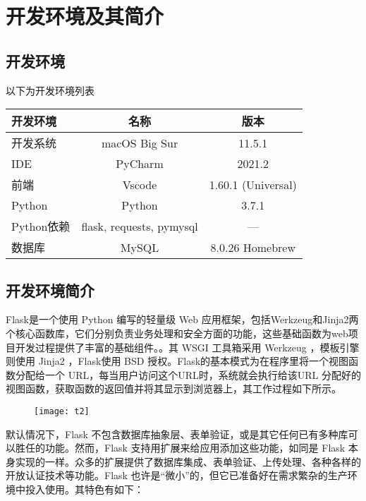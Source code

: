 \chapter{开发环境及其简介}
\section{开发环境}

以下为开发环境列表
\begin{center}
  \begin{tabular}{lcc}
    \hline
    开发环境 & 名称 & 版本 \\
    \hline
    开发系统 & macOS Big Sur & 11.5.1\\
    IDE & PyCharm & 2021.2\\
    前端 & Vscode & 1.60.1 (Universal)\\
    Python & Python & 3.7.1\\
    Python依赖 & flask, requests, pymysql &  --- \\
    数据库 & MySQL & 8.0.26 Homebrew\\
    \hline
  \end{tabular}
\end{center}

\section{开发环境简介}

Flask是一个使用 Python 编写的轻量级 Web 应用框架，包括Werkzeug和Jinja2两个核心函数库，它们分别负责业务处理和安全方面的功能，这些基础函数为web项目开发过程提供了丰富的基础组件。。其 WSGI 工具箱采用 Werkzeug ，模板引擎则使用 Jinja2 ，Flask使用 BSD 授权。Flask的基本模式为在程序里将一个视图函数分配给一个 URL，每当用户访问这个URL时，系统就会执行给该URL 分配好的视图函数，获取函数的返回值并将其显示到浏览器上，其工作过程如下所示。\citep{grinberg2018flask}

\begin{figure}[H]
  \centering
  \texttt{[image: t2]}
  \label{fig:t2}
\end{figure}


默认情况下，Flask 不包含数据库抽象层、表单验证，或是其它任何已有多种库可以胜任的功能。然而，Flask 支持用扩展来给应用添加这些功能，如同是 Flask 本身实现的一样。众多的扩展提供了数据库集成、表单验证、上传处理、各种各样的开放认证技术等功能。Flask 也许是“微小”的，但它已准备好在需求繁杂的生产环境中投入使用。\citep{赵娟2020浅谈时空大数据与数据可视化在疫情地图中的应用}其特色有如下：

